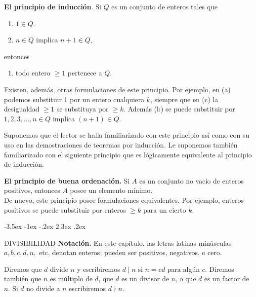 \documentclass[12pt,a4paper]{book}
\makeatletter
\renewcommand\section{\@startsection{section}{1}{\z@}%
  {-3.5ex \@plus -1ex \@minus -.2ex}%
  {2.3ex \@plus .2ex}%
  {\normalfont\Large\bfseries\raggedright}}
\makeatother
\begin{document}
    \textbf{El principio de inducción}. Si $Q$ es un conjunto de enteros tales que
    \begin{enumerate}
        \item[(a)] $1\in Q$.
        \item[(b)] $n\in Q$ implica $n+1\in Q$, 
    \end{enumerate}
    entonces
    \begin{enumerate}
        \item[(c)] todo entero $\geq1$ pertenece a $Q$.
    \end{enumerate}

    Existen, además, otras formulaciones de este principio. Por ejemplo, en (a) podemos
    substituir 1 por un entero cualquiera $k$, siempre que en (c) la desigualdad $\geq1$
    se substituya por $\geq k$. Además (b) se puede substituir por $1,2,3,\dots,n\in Q$
    implica $(n+1)\in Q$.

    Suponemos que el lector se halla familiarizado con este principio así como con su uso en las
    demostraciones de teoremas por inducción. Le suponemos también familiarizado con el siguiente
    principio que es lógicamente equivalente al principio de inducción.

    \textbf{El principio de buena ordenación.} Si $A$ es un conjunto no vacío de enteros positivos,
    entonces $A$ posee un elemento mínimo.\\
    De nuevo, este principio posee formulaciones equivalentes. Por ejemplo, enteros positivos
    se puede substituir por enteros $\geq k$ para un cierto $k$.

    \section{DIVISIBILIDAD}
    \textbf{Notación.} En este capítulo, las letras latinas minúsculas $a,b,c,d,n,$ etc,
    denotan enteros; pueden ser positivos, negativos, o cero.

    \begin{definicion}[Divisibilidad]\label{sim:dvd}
        Diremos que $d$ divide $n$ y escribiremos $d\mid n$ si $n=cd$ para algún $c$.
        Diremos también que $n$ es múltiplo de $d$, que $d$ es un divisor de $n$, o que
        $d$ es un factor de $n$. Si $d$ no divide a $n$ escribiremos $d\nmid n$.
    \end{definicion}
\end{document}
